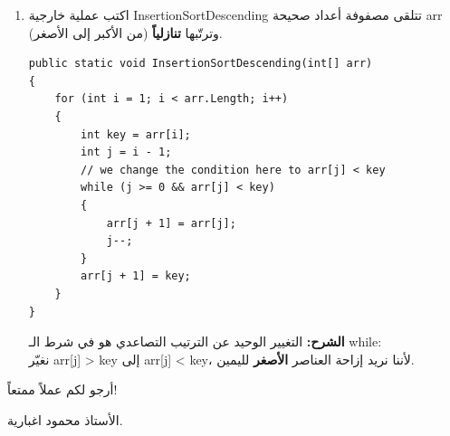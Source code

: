 \documentclass[14pt]{extarticle}
\begin{document}
\begin{enumerate}[itemsep=3em]
\item
اكتب عملية خارجية \textenglish{InsertionSortDescending} تتلقى مصفوفة أعداد صحيحة \textenglish{arr} وترتّبها \textbf{تنازلياً} (من الأكبر إلى الأصغر).

\ifwithsols
\begin{boxSolution}
\begin{english}
\begin{boxCode}
\begin{verbatim}
public static void InsertionSortDescending(int[] arr)
{
    for (int i = 1; i < arr.Length; i++)
    {
        int key = arr[i];
        int j = i - 1;
        // we change the condition here to arr[j] < key
        while (j >= 0 && arr[j] < key)
        {
            arr[j + 1] = arr[j];
            j--;
        }
        arr[j + 1] = key;
    }
}
\end{verbatim}
\end{boxCode}
\end{english}
\textbf{الشرح:} التغيير الوحيد عن الترتيب التصاعدي هو في شرط الـ \textenglish{while}: \\
 نغيّر \textenglish{arr[j] > key} إلى \textenglish{arr[j] < key}، لأننا نريد إزاحة العناصر \textbf{الأصغر} لليمين.
\end{boxSolution}
\clearpage
\fi

\end{enumerate}

\vspace{1cm}
\begin{flushleft}
أرجو لكم عملاً ممتعاً!

الأستاذ محمود اغبارية.
\end{flushleft}
\end{document}
